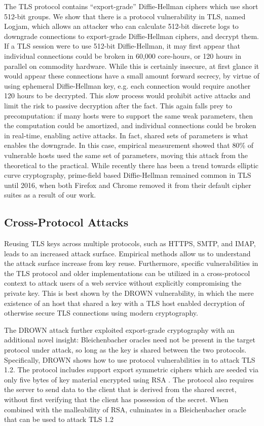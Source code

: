 The TLS protocol contains ``export-grade'' Diffie-Hellman ciphers which use
short 512-bit groups. We show that there is a protocol vulnerability in TLS,
named Logjam, which allows an attacker who can calculate 512-bit discrete logs
to downgrade connections to export-grade Diffie-Hellman ciphers, and decrypt
them. If a TLS session were to use 512-bit Diffie-Hellman, it may first appear
that individual connections could be broken in 60,000 core-hours, or 120 hours
in parallel on commodity hardware. While this is certainly insecure, at first
glance it would appear these connections have a small amount forward secrecy,
by virtue of using ephemeral Diffie-Hellman key, e.g. each connection would
require another 120 hours to be decrypted. This slow process would prohibit
active attacks and limit the risk to passive decryption after the fact. This
again falls prey to precomputation: if many hosts were to support the same weak
parameters, then the computation could be amortized, and individual connections
could be broken in real-time, enabling active attacks. In fact, shared sets of
parameters is what enables the downgrade. In this case, empirical measurement
showed that 80\% of vulnerable hosts used the same set of parameters, moving
this attack from the theoretical to the practical. While recently there has
been a trend towards elliptic curve cryptography, prime-field based
Diffie-Hellman remained common in TLS until 2016, when both Firefox and Chrome
removed it from their default cipher suites as a result of our work.

\subsection{Cross-Protocol Attacks}

Reusing TLS keys across multiple protocols, such as HTTPS, SMTP, and IMAP,
leads to an increased attack surface. Empirical methods allow us to understand
the attack surface increase from key reuse. Furthermore, specific
vulnerabilities in the TLS protocol and older implementations can be utilized
in a cross-protocol context to attack users of a web service without explicitly
compromising the private key. This is best shown by the DROWN vulnerability, in
which the mere existence of an \ssltwo host that shared a key with a TLS host
enabled decryption of otherwise secure TLS connections using modern
cryptography.

The DROWN attack further exploited export-grade cryptography with an additional
novel insight: Bleichenbacher oracles need not be present in the target
protocol under attack, so long as the key is shared between the two protocols.
Specifically, DROWN shows how to use protocol vulnerabilities in \ssltwo to
attack TLS 1.2. The \ssltwo protocol includes support export symmetric ciphers
which are seeded via only five bytes of key material encrypted using RSA \PKCS.
The \ssltwo protocol also requires the server to send data to the client that is
derived from the shared secret, without first verifying that the client has
possession of the secret. When combined with the malleability of RSA,
culminates in a Bleichenbacher oracle that can be used to attack TLS 1.2


